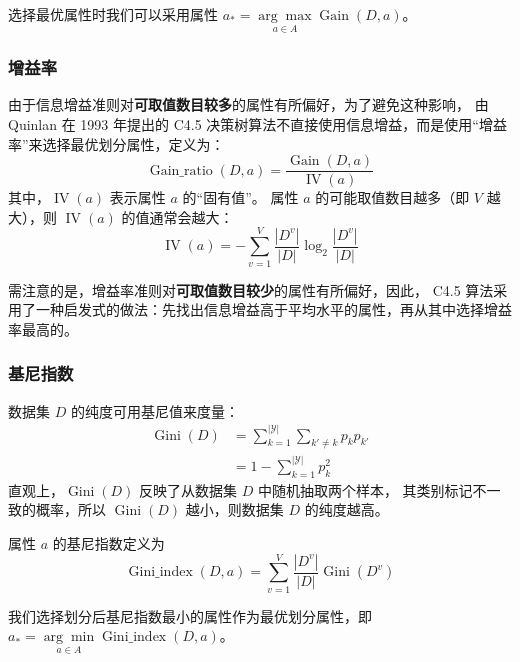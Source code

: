 选择最优属性时我们可以采用属性 $a_* = \underset{a \in A}{\arg\max}\operatorname{Gain}(D, a)$。

\subsubsection{增益率}
由于信息增益准则对\textbf{可取值数目较多}的属性有所偏好，为了避免这种影响，
由 Quinlan 在 1993 年提出的 C4.5 决策树算法不直接使用信息增益，而是使用“增益率”来选择最优划分属性，定义为：
\begin{equation}
    \operatorname{Gain\_ratio}(D, a) = \dfrac{\operatorname{Gain}(D, a)}{\operatorname{IV}(a)}
\end{equation}
其中，$\operatorname{IV}(a)$ 表示属性 $a$ 的“固有值”。
属性 $a$ 的可能取值数目越多（即 $V$ 越大），则 $\operatorname{IV}(a)$ 的值通常会越大：
\begin{equation}
    \operatorname{IV}(a) = -\sum\limits_{v = 1}^V
    {\dfrac{|D^v|}{|D|}\log _2\dfrac{|D^v|}{|D|}}
\end{equation}

需注意的是，增益率准则对\textbf{可取值数目较少}的属性有所偏好，因此，
C4.5 算法采用了一种启发式的做法：先找出信息增益高于平均水平的属性，再从其中选择增益率最高的。

\subsubsection{基尼指数}
数据集 $D$ 的纯度可用基尼值来度量：
\begin{equation}
    \begin{aligned}
        \operatorname{Gini}(D) &= \sum\limits_{k=1}^{|\mathcal Y|}{\sum\limits_{k' \neq k}p_kp_{k'}} \\
        &=1 - \sum\limits_{k=1}^{|\mathcal Y|} p_k^2
        \end{aligned}
\end{equation}
直观上，$\operatorname{Gini}(D)$ 反映了从数据集 $D$ 中随机抽取两个样本，
其类别标记不一致的概率，所以 $\operatorname{Gini}(D)$ 越小，则数据集 $D$ 的纯度越高。

属性 $a$ 的基尼指数定义为
\begin{equation}
    \operatorname{Gini\_index}(D, a) = \sum\limits_{v = 1}^V
    {\dfrac{|D^v|}{|D|}\operatorname{Gini}(D^v)}
\end{equation}

我们选择划分后基尼指数最小的属性作为最优划分属性，即 $a_* = \underset{a \in A}{\arg\min}\operatorname{Gini\_index}(D, a)$。


